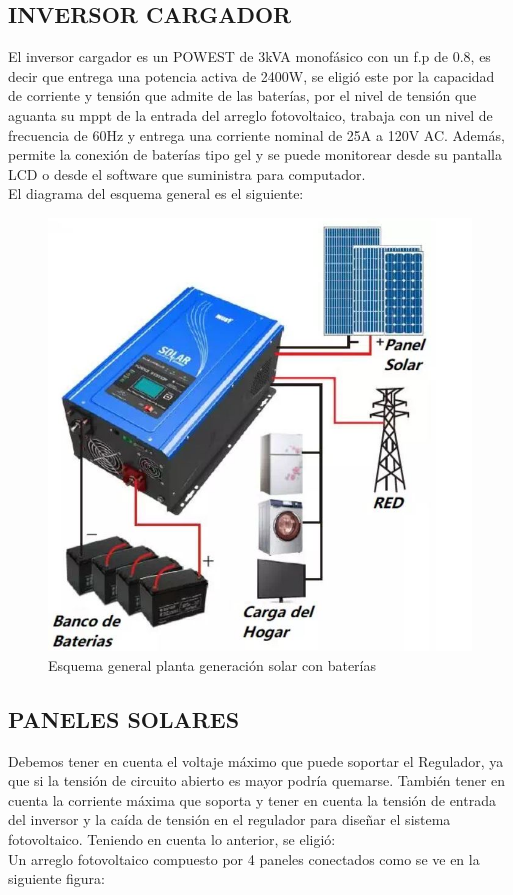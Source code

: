 \documentclass[journal]{IEEEtran}
\begin{document}
\subsection*{INVERSOR CARGADOR}
El inversor cargador es un POWEST de 3kVA monofásico con un f.p de 0.8, es decir que entrega una potencia activa de 2400W, se eligió este por la capacidad de corriente y tensión que admite de las baterías, por el nivel de tensión que aguanta su mppt de la entrada del arreglo fotovoltaico, trabaja con un nivel de frecuencia de 60Hz y entrega una corriente nominal de 25A a 120V AC. Además, permite la conexión de baterías tipo gel y se puede monitorear desde su pantalla LCD o desde el software que suministra para computador.\\

El diagrama del esquema general es el siguiente:\\

\begin{figure}[H]
    \centering
    \includegraphics[scale=0.4]{esq_inv.JPG}
    \caption{Esquema general planta generación solar con baterías}
    \label{curva}
\end{figure}


\subsection*{PANELES SOLARES}
Debemos tener en cuenta el voltaje máximo que puede soportar el Regulador, ya que si la tensión de circuito abierto es mayor podría quemarse. También tener en cuenta la corriente máxima que soporta y tener en cuenta la tensión de entrada del inversor y la caída de tensión en el regulador para diseñar el sistema fotovoltaico.  Teniendo en cuenta lo anterior, se eligió: \\
Un arreglo fotovoltaico compuesto por 4 paneles conectados como se ve en la siguiente figura:\\
\end{document}
